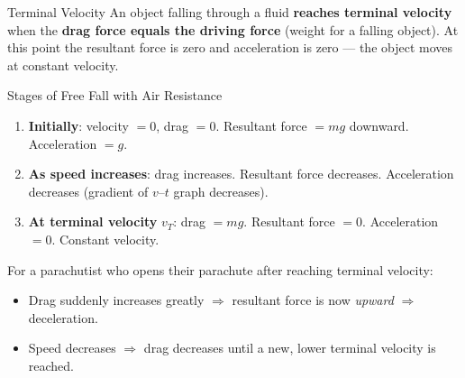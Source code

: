 \begin{definitionbox}{Terminal Velocity}
An object falling through a fluid \textbf{reaches terminal velocity} when the \textbf{drag force equals the driving force} (weight for a falling object). At this point the resultant force is zero and acceleration is zero — the object moves at constant velocity.
\end{definitionbox}

\vspace{2cm}

\begin{center}
\end{center}

\pagebreak

\begin{keybox}{Stages of Free Fall with Air Resistance}
\begin{enumerate}[itemsep=3pt]
  \item \textbf{Initially}: velocity $= 0$, drag $= 0$. Resultant force $= mg$ downward. Acceleration $= g$.
  \item \textbf{As speed increases}: drag increases. Resultant force decreases. Acceleration decreases (gradient of $v$--$t$ graph decreases).
  \item \textbf{At terminal velocity} $v_T$: drag $= mg$. Resultant force $= 0$. Acceleration $= 0$. Constant velocity.
\end{enumerate}

For a parachutist who opens their parachute after reaching terminal velocity:
\begin{itemize}[itemsep=2pt]
  \item Drag suddenly increases greatly $\Rightarrow$ resultant force is now \emph{upward} $\Rightarrow$ deceleration.
  \item Speed decreases $\Rightarrow$ drag decreases until a new, lower terminal velocity is reached.
\end{itemize}
\end{keybox}

